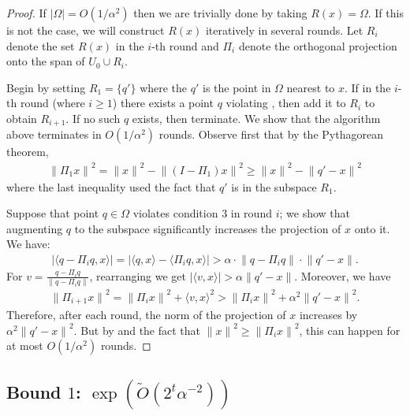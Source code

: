 \documentclass[11pt]{article}
\theoremstyle{restate}
\theoremstyle{definition}
\newcommand{\norm}[1]{\ensuremath{\|#1\|}}
\begin{document}
\begin{proof}
    If $|\Omega| = O(1/\alpha^2)$ then we are trivially done by taking $R(x) = \Omega$. If this is not the case, we will construct $R(x)$ iteratively in several rounds. Let $R_i$ denote the set $R(x)$ in the $i$-th round and $\Pi_i$ denote the orthogonal projection onto the span of $U_0 \cup R_i$.

    Begin by setting $R_1 = \{q'\}$ where the $q'$ is the point in $\Omega$ nearest to $x$. If in the $i$-th round (where $i \geq 1$) there exists a point $q$ violating , then add it to $R_i$ to obtain $R_{i+1}$. If no such $q$ exists, then terminate. We show that the algorithm above terminates in $O(1/\alpha^2)$ rounds. Observe first that by the Pythagorean theorem, 
    \begin{align}\label{lem: proj-lower-bound}
    \norm{\Pi_1 x}^2 = \norm{x}^2 - \norm{(I-\Pi_1)x}^2 \geq \norm{x}^2 - \norm{q' - x}^2
    \end{align}where the last inequality used the fact that $q'$ is in the subspace $R_1$.
    
    Suppose that point $q \in \Omega$ violates condition $3$ in round $i$; we show that augmenting $q$ to the subspace significantly increases the projection of $x$ onto it. We have:
    \begin{align}\label{eq: v-eq}
        |\langle q - \Pi_i q, x \rangle| = |\langle q, x \rangle - \langle \Pi_iq, x \rangle| > \alpha \cdot \norm{q - \Pi_i q} \cdot \norm{q' - x}.
    \end{align}
    For $v =\tfrac{ q - \Pi_i q}{\norm{q - \Pi_i q }}$, rearranging  we get $|\langle v, x \rangle| > \alpha \norm{q' - x}$.  Moreover, we have 
    \begin{align}
    \norm{\Pi_{i+1} x}^2 = \norm{\Pi_i x}^2 + \langle v, x \rangle ^2 > \norm{\Pi_i x}^2 + \alpha^2 \norm{q' - x}^2.
    \end{align}
    Therefore, after each round, the norm of the projection of $x$ increases by $\alpha ^2 \norm{q' - x}^2$. But by  and the fact that $\norm{x}^2 \geq \norm{\Pi_i x}^2$, this can happen for at most $O(1/\alpha^2)$ rounds. 
\end{proof}



\subsection{\texorpdfstring{Bound $1$: $\exp(\tilde{O}(2^t \alpha^{-2}))$}{Bound 1}}\label{subsec: net-bound-1}
\end{document}
